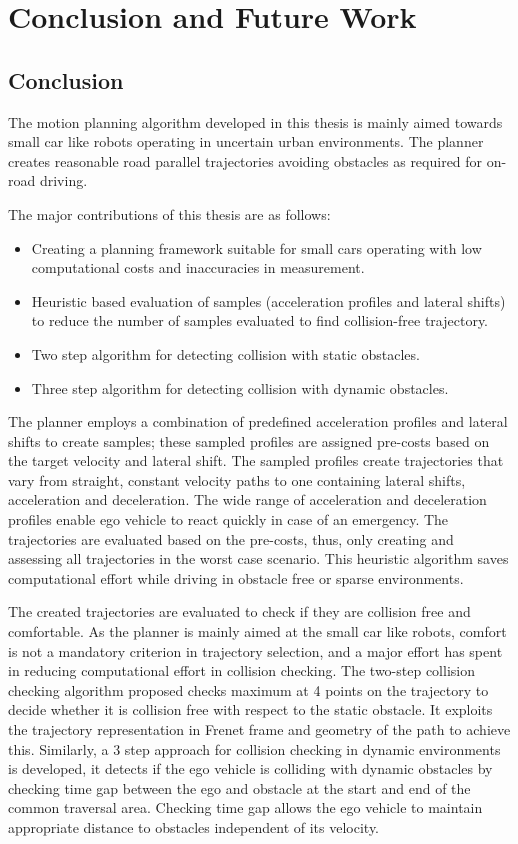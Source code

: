\chapter{Conclusion and Future Work}
\label{conclusion}
\section{Conclusion}

The motion planning algorithm developed in this thesis is mainly aimed towards small car like robots operating in uncertain urban environments. The planner creates reasonable road parallel trajectories avoiding obstacles as required for on-road driving.

The major contributions of this thesis are as follows:

\begin{itemize}
	\item Creating a planning framework suitable for small cars operating with low computational costs and inaccuracies in measurement.
	\item Heuristic based evaluation of samples (acceleration profiles and lateral shifts) to reduce the number of samples evaluated to find collision-free trajectory.
	\item Two step algorithm for detecting collision with static obstacles.
	\item Three step algorithm for detecting collision with dynamic obstacles.
\end{itemize}

The planner employs a combination of predefined acceleration profiles and lateral shifts to create samples; these sampled profiles are assigned pre-costs based on the target velocity and lateral shift. The sampled profiles create trajectories that vary from straight, constant velocity paths to one containing lateral shifts, acceleration and deceleration. The wide range of acceleration and deceleration profiles enable ego vehicle to react quickly in case of an emergency. The trajectories are evaluated based on the pre-costs, thus, only creating and assessing all trajectories in the worst case scenario. This heuristic algorithm saves computational effort while driving in obstacle free or sparse environments.

The created trajectories are evaluated to check if they are collision free and comfortable. As the planner is mainly aimed at the small car like robots, comfort is not a mandatory criterion in trajectory selection, and a major effort has spent in reducing computational effort in collision checking. The two-step collision checking algorithm proposed checks maximum at 4 points on the trajectory to decide whether it is collision free with respect to the static obstacle. It exploits the trajectory representation in Frenet frame and geometry of the path to achieve this. Similarly, a 3 step approach for collision checking in dynamic environments is developed, it detects if the ego vehicle is colliding with dynamic obstacles by checking time gap between the ego and obstacle at the start and end of the common traversal area. Checking time gap allows the ego vehicle to maintain appropriate distance to obstacles independent of its velocity.

